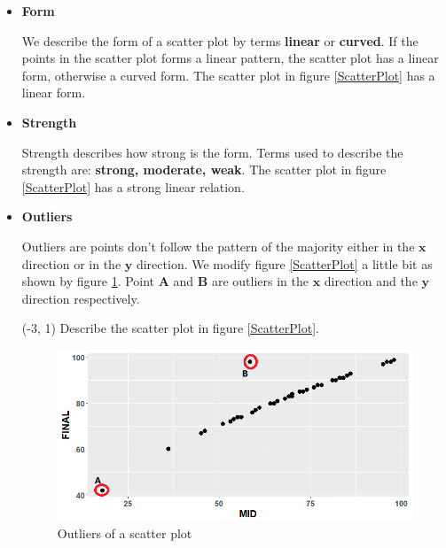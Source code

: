 \documentclass[a4paper, 12pt,twoside]{book}
\begin{document}
\begin{itemize}
\begin{itemize}[leftmargin = 0.5cm]
  \vspace{0.6cm}
 
 \item \textbf{Form}
 \vspace{0.6cm}
 
We describe the form of a scatter plot by terms \textbf{linear} or \textbf{curved}. If the points in the scatter plot forms a linear pattern, the scatter plot has a linear form, otherwise a curved form. The scatter plot in figure \ref{ScatterPlot} has a  linear form.
\vspace{0.6cm}

\item \textbf{Strength}
\vspace{0.6cm}

Strength describes how strong is the form. Terms used to describe the strength are: \textbf{strong, moderate, weak}.
The scatter plot in figure \ref{ScatterPlot} has a strong linear relation.
\vspace{0.6cm}

\item \textbf{Outliers}
\vspace{0.6cm}

Outliers are points don't follow the pattern of the majority either in the $\textbf{x}$ direction or in the $\textbf{y}$ direction. We modify figure \ref{ScatterPlot} a little bit as shown by figure \ref{ScatterPlotOutliers}. Point \textbf{A} and \textbf{B} are outliers in the $\textbf{x}$ direction and the $\textbf{y}$ direction  respectively.

\begin{textblock}{4}(-3, 1)
Describe the scatter plot in figure \ref{ScatterPlot}.
\end{textblock}

\begin{figure}[H]
\centering
\includegraphics[scale=0.5]{ScatterPlotOutliers.png}
\caption{Outliers of a scatter plot}
\label{ScatterPlotOutliers}
\end{figure}
\end{itemize}



\end{itemize}
\end{document}
